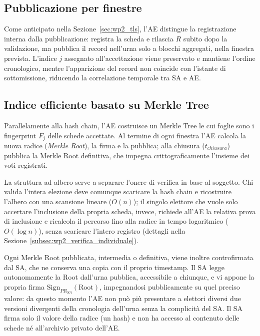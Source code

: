 \subsection{Pubblicazione per finestre}
\label{subsec:wp2_pubblicazione_finestre}

Come anticipato nella Sezione~\ref{sec:wp2_tls}, l'AE distingue la registrazione interna dalla pubblicazione: registra la scheda e rilascia $R$ subito dopo la validazione, ma pubblica il record nell'urna solo a blocchi aggregati, nella finestra prevista. L'indice $j$ assegnato all'accettazione viene preservato e mantiene l'ordine cronologico, mentre l'apparizione del record non coincide con l'istante di sottomissione, riducendo la correlazione temporale tra SA e AE.

\subsection{Indice efficiente basato su Merkle Tree}
\label{subsec:wp2_merkle_tree}

Parallelamente alla hash chain, l'AE costruisce un Merkle Tree le cui foglie sono i fingerprint $F_j$ delle schede accettate. Al termine di ogni finestra l'AE calcola la nuova radice (\textit{Merkle Root}), la firma e la pubblica; alla chiusura ($t_{chiusura}$) pubblica la Merkle Root definitiva, che impegna crittograficamente l'insieme dei voti registrati.

La struttura ad albero serve a separare l'onere di verifica in base al soggetto. Chi valida l'intera elezione deve comunque scaricare la hash chain e ricostruire l'albero con una scansione lineare ($O(n)$); il singolo elettore che vuole solo accertare l'inclusione della propria scheda, invece, richiede all'AE la relativa prova di inclusione e ricalcola il percorso fino alla radice in tempo logaritmico ($O(\log n)$), senza scaricare l'intero registro (dettagli nella Sezione~\ref{subsec:wp2_verifica_individuale}).

Ogni Merkle Root pubblicata, intermedia o definitiva, viene inoltre controfirmata dal SA, che ne conserva una copia con il proprio timestamp. Il SA legge autonomamente la Root dall'urna pubblica, accessibile a chiunque, e vi appone la propria firma $\text{Sign}_{PR_{SA}}(\text{Root})$, impegnandosi pubblicamente su quel preciso valore: da questo momento l'AE non può più presentare a elettori diversi due versioni divergenti della cronologia dell'urna senza la complicità del SA. Il SA firma solo il valore della radice (un hash) e non ha accesso al contenuto delle schede né all'archivio privato dell'AE.

